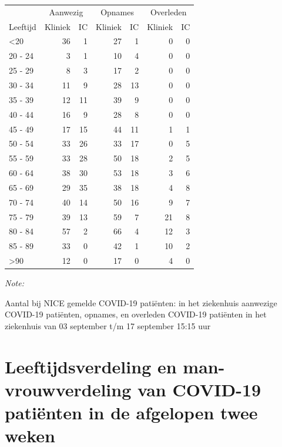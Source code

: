 \documentclass[
  english,
  man,floatsintext]{apa6}
\begin{document}
\begin{table}
\centering\begingroup\fontsize{10}{12}\selectfont

\begin{threeparttable}
\begin{tabular}{lrrrrrr}
\toprule
\multicolumn{1}{c}{ } & \multicolumn{2}{c}{Aanwezig} & \multicolumn{2}{c}{Opnames} & \multicolumn{2}{c}{Overleden} \\
\cmidrule(l{3pt}r{3pt}){2-3} \cmidrule(l{3pt}r{3pt}){4-5} \cmidrule(l{3pt}r{3pt}){6-7}
Leeftijd & Kliniek & IC & Kliniek & IC & Kliniek & IC\\
\midrule
<20 & 36 & 1 & 27 & 1 & 0 & 0\\
20 - 24 & 3 & 1 & 10 & 4 & 0 & 0\\
25 - 29 & 8 & 3 & 17 & 2 & 0 & 0\\
30 - 34 & 11 & 9 & 28 & 13 & 0 & 0\\
35 - 39 & 12 & 11 & 39 & 9 & 0 & 0\\
40 - 44 & 16 & 9 & 28 & 8 & 0 & 0\\
45 - 49 & 17 & 15 & 44 & 11 & 1 & 1\\
50 - 54 & 33 & 26 & 33 & 17 & 0 & 5\\
55 - 59 & 33 & 28 & 50 & 18 & 2 & 5\\
60 - 64 & 38 & 30 & 53 & 18 & 3 & 6\\
65 - 69 & 29 & 35 & 38 & 18 & 4 & 8\\
70 - 74 & 40 & 14 & 50 & 16 & 9 & 7\\
75 - 79 & 39 & 13 & 59 & 7 & 21 & 8\\
80 - 84 & 57 & 2 & 66 & 4 & 12 & 3\\
85 - 89 & 33 & 0 & 42 & 1 & 10 & 2\\
>90 & 12 & 0 & 17 & 0 & 4 & 0\\
\bottomrule
\end{tabular}
\begin{tablenotes}
\item \textit{Note: } 
\item Aantal bij NICE gemelde COVID-19 patiënten: in het ziekenhuis aanwezige COVID-19 patiënten, opnames, en overleden COVID-19 patiënten in het ziekenhuis van 03 september t/m 17 september 15:15 uur
\end{tablenotes}
\end{threeparttable}
\endgroup{}
\end{table}

\newpage

\hypertarget{leeftijdsverdeling-en-man-vrouwverdeling-van-covid-19-patiuxebnten-in-de-afgelopen-twee-weken}{%
\section{Leeftijdsverdeling en man-vrouwverdeling van COVID-19 patiënten in de afgelopen twee weken}\label{leeftijdsverdeling-en-man-vrouwverdeling-van-covid-19-patiuxebnten-in-de-afgelopen-twee-weken}}
\end{document}
